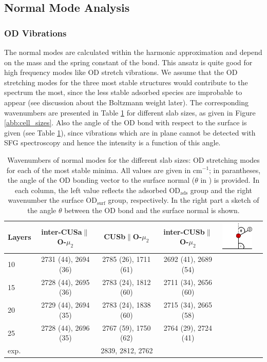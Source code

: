 \documentclass[11pt,DIV=13,BCOR=5mm,a4paper,headinclude]{scrbook}
\begin{document}
\subsection{Normal Mode Analysis}\label{nma}
\subsubsection{OD Vibrations}

The normal modes are calculated within the harmonic approximation and depend on the mass and the spring constant of the bond.
This ansatz is quite good for high frequency modes like OD stretch vibrations.
We assume that the OD stretching modes for the three most stable structures would contribute to the spectrum the most, since the less stable adsorbed species are improbable to appear (see discussion about the Boltzmann weight later).
The corresponding wavenumbers are presented in Table \ref{tab:freq_layers} for different slab sizes, as given in Figure \ref{abb:cell_sizes}.
Also the angle of the OD bond with respect to the surface is given (see Table \ref{tab:freq_layers}), since vibrations which are in plane cannot be detected with SFG spectroscopy and hence the intensity is a function of this angle.
\begin{table}[th]
  \centering
 \caption{Wavenumbers of normal modes for the different slab sizes: OD stretching modes for each of the most stable minima.
All values are given in cm$^{-1}$; in parantheses, the angle of the OD bonding vector to the surface normal ($\theta$ in \textdegree) is provided.
In each column, the left value reflects the adsorbed OD$_\textrm{ads}$ group and the right wavenumber the surface OD$_\textrm{surf}$ group, respectively.
 In the right part a sketch of the angle $\theta$ between the OD bond and the surface normal is shown.}
\vspace*{.2cm} 
 \begin{tabular}{l|ccccc}
 \toprule
  Layers&inter-CUSa$\parallel$O-$\mu_2$ &CUSb$\parallel$O-$\mu_2$  &inter-CUSb$\parallel$O-$\mu_2$&\multirow{6}{1pt}{\includegraphics[width=2cm]{figures/11-20/ODangle.png}} \\\midrule
  10 &2731 (44), 2694 (36) &2785 (26), 1711 (61) &2692 (41), 2689 (54)& \\
  15 &2728 (44), 2695 (36) &2783 (24), 1812 (60) &2711 (34), 2656 (60)& \\
  20 &2729 (44), 2694 (35) &2783 (24), 1838 (60) &2715 (34), 2665 (58)& \\
  25 &2728 (44), 2696 (35) &2767 (59), 1750 (62) &2764 (29), 2724 (41)& \\\midrule
  exp. & \multicolumn{3}{c}{2839, 2812, 2762}& \\\bottomrule
  \end{tabular} 
  \label{tab:freq_layers}
\end{table}
\\\\
\end{document}
